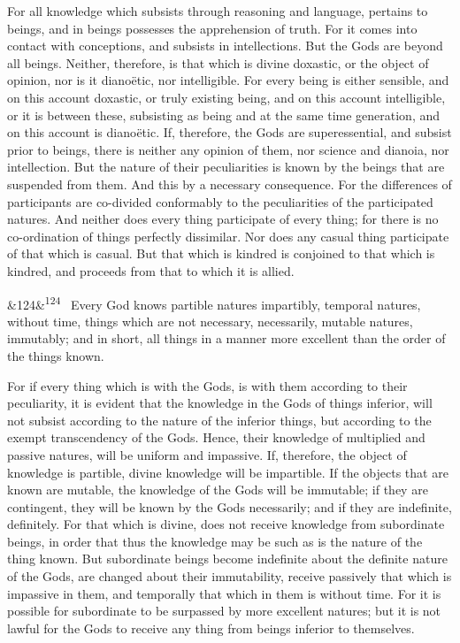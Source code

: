 \documentclass[12pt]{article}
\newcommand{\para}[1][]{\par\noindent\ifx&#1&\else\textsuperscript{\footnotesize #1}~\fi}
\begin{document}
For all knowledge which subsists through reasoning and language, pertains to beings, and in beings possesses the apprehension of truth. For it comes into contact with conceptions, and subsists in intellections. But the Gods are beyond all beings. Neither, therefore, is that which is divine doxastic, or the object of opinion, nor is it dianoëtic, nor intelligible. For every being is either sensible, and on this account doxastic, or truly existing being, and on this account intelligible, or it is between these, subsisting as being and at the same time generation, and on this account is dianoëtic. If, therefore, the Gods are superessential, and subsist prior to beings, there is neither any opinion of them, nor science and dianoia, nor intellection. But the nature of their peculiarities is known by the beings that are suspended from them. And this by a necessary consequence. For the differences of participants are co-divided conformably to the peculiarities of the participated natures. And neither does every thing participate of every thing; for there is no co-ordination of things perfectly dissimilar. Nor does any casual thing participate of that which is casual. But that which is kindred is conjoined to that which is kindred, and proceeds from that to which it is allied.

\para[124] Every God knows partible natures impartibly, temporal natures, without time, things which are not necessary, necessarily, mutable natures, immutably; and in short, all things in a manner more excellent than the order of the things known.

For if every thing which is with the Gods, is with them according to their peculiarity, it is evident that the knowledge in the Gods of things inferior, will not subsist according to the nature of the inferior things, but according to the exempt transcendency of the Gods. Hence, their knowledge of multiplied and passive natures, will be uniform and impassive. If, therefore, the object of knowledge is partible, divine knowledge will be impartible. If the objects that are known are mutable, the knowledge of the Gods will be immutable; if they are contingent, they will be known by the Gods necessarily; and if they are indefinite, definitely. For that which is divine, does not receive knowledge from subordinate beings, in order that thus the knowledge may be such as is the nature of the thing known. But subordinate beings become indefinite about the definite nature of the Gods, are changed about their immutability, receive passively that which is impassive in them, and temporally that which in them is without time. For it is possible for subordinate to be surpassed by more excellent natures; but it is not lawful for the Gods to receive any thing from beings inferior to themselves.
\end{document}
